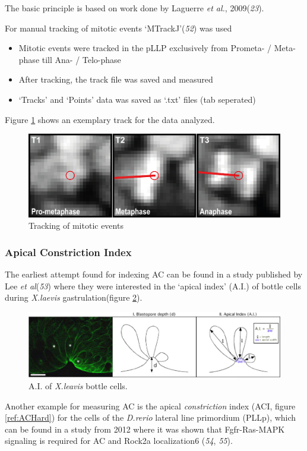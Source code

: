 \documentclass[11pt,singlespacinge,twoside]{reedthesis} %
\providecommand{\tightlist}{%
  \setlength{\itemsep}{0pt}\setlength{\parskip}{0pt}}
\begin{document}
The basic principle is based on work done by Laguerre \emph{et al.}, 2009(\emph{23}).

\noindent For manual tracking of mitotic events `MTrackJ'(\emph{52}) was used
\begin{itemize}
\tightlist
\item
  Mitotic events were tracked in the pLLP exclusively from Prometa- / Meta-phase till Ana- / Telo-phase
\item
  After tracking, the track file was saved and measured
\item
  `Tracks' and `Points' data was saved as `.txt' files (tab seperated)
\end{itemize}
\noindent Figure \ref{fig:mitodatapoints} shows an exemplary track for the data analyzed.


\begin{figure}

{\centering \includegraphics[width=0.5\linewidth]{figure/02-MaMo/Prol/Prolif} 

}

\caption{Tracking of mitotic events}\label{fig:mitodatapoints}
\end{figure}
\hypertarget{ACI}{%
\subsubsection{Apical Constriction Index}\label{ACI}}

The earliest attempt found for indexing AC can be found in a study published by Lee \emph{et al}(\emph{53}) where they were interested in the `apical index' (A.I.) of bottle cells during \emph{X.laevis} gastrulation(figure \ref{fig:ACLee}).


\begin{figure}

{\centering \includegraphics[width=0.75\linewidth]{figure/02-MaMo/ACI/Jen_yi_Lee} 

}

\caption{A.I. of \emph{X.leavis} bottle cells.}\label{fig:ACLee}
\end{figure}
\noindent Another example for measuring AC is the apical \emph{constriction} index (ACI, figure \ref{ref:ACHard}) for the cells of the \emph{D.rerio} lateral line primordium (PLLp), which can be found in a study from 2012 where it was shown that Fgfr-Ras-MAPK signaling is required for AC and Rock2a localization6 (\emph{54}, \emph{55}).
\end{document}
